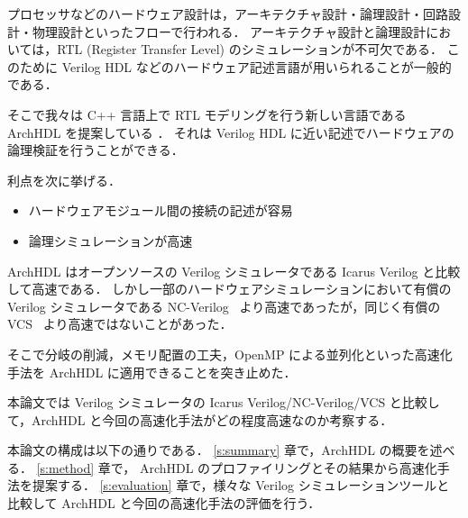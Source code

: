 プロセッサなどのハードウェア設計は，アーキテクチャ設計・論理設計・回路設計・物理設計といったフローで行われる．
アーキテクチャ設計と論理設計においては，RTL (Register Transfer Level) のシミュレーションが不可欠である．
このために Verilog HDL などのハードウェア記述言語が用いられることが一般的である．

そこで我々は C++ 言語上で RTL モデリングを行う新しい言語である ArchHDL を提案している \cite{satos:archhdl}．
それは Verilog HDL に近い記述でハードウェアの論理検証を行うことができる．

利点を次に挙げる．

\begin{itemize}
\itemsep1pt\parskip0pt
\item
  ハードウェアモジュール間の接続の記述が容易
\item
  論理シミュレーションが高速
\end{itemize}

ArchHDL はオープンソースの Verilog シミュレータである Icarus Verilog \cite{iverilog}と比較して高速である．
しかし一部のハードウェアシミュレーションにおいて有償の Verilog シミュレータである NC-Verilog~\cite{ncverilog} より高速であったが，同じく有償の VCS~\cite{vcs} より高速ではないことがあった．

そこで分岐の削減，メモリ配置の工夫，OpenMP による並列化といった高速化手法を ArchHDL に適用できることを突き止めた．

本論文では Verilog シミュレータの Icarus Verilog/NC-Verilog/VCS と比較して，ArchHDL と今回の高速化手法がどの程度高速なのか考察する．

本論文の構成は以下の通りである． \ref{s:summary} 章で，ArchHDL の概要を述べる．
\ref{s:method} 章で， ArchHDL のプロファイリングとその結果から高速化手法を提案する．
\ref{s:evaluation} 章で，様々な Verilog シミュレーションツールと比較して ArchHDL と今回の高速化手法の評価を行う．
